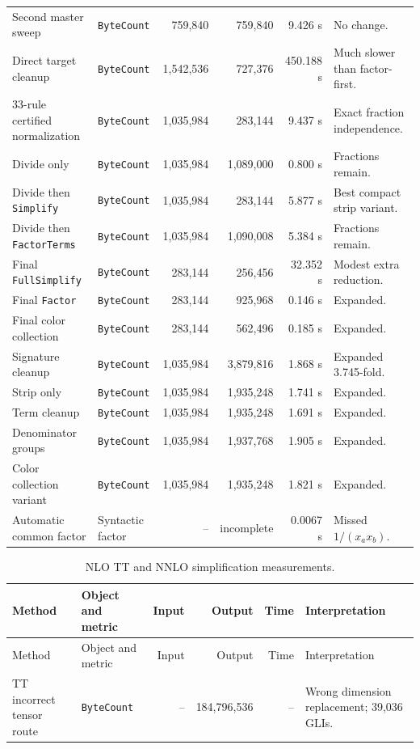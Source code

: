 \documentclass[11pt]{article}
\newcommand{\code}[1]{\texttt{#1}}
\begin{document}
\begin{landscape}
\begin{longtable}{@{}llrrrl@{}}
Second master sweep & \code{ByteCount} & 759,840 & 759,840 & 9.426 s & No change.\\
Direct target cleanup & \code{ByteCount} & 1,542,536 & 727,376 & 450.188 s & Much slower than factor-first.\\
33-rule certified normalization & \code{ByteCount} & 1,035,984 & 283,144 & 9.437 s & Exact fraction independence.\\
Divide only & \code{ByteCount} & 1,035,984 & 1,089,000 & 0.800 s & Fractions remain.\\
Divide then \code{Simplify} & \code{ByteCount} & 1,035,984 & 283,144 & 5.877 s & Best compact strip variant.\\
Divide then \code{FactorTerms} & \code{ByteCount} & 1,035,984 & 1,090,008 & 5.384 s & Fractions remain.\\
Final \code{FullSimplify} & \code{ByteCount} & 283,144 & 256,456 & 32.352 s & Modest extra reduction.\\
Final \code{Factor} & \code{ByteCount} & 283,144 & 925,968 & 0.146 s & Expanded.\\
Final color collection & \code{ByteCount} & 283,144 & 562,496 & 0.185 s & Expanded.\\
Signature cleanup & \code{ByteCount} & 1,035,984 & 3,879,816 & 1.868 s & Expanded 3.745-fold.\\
Strip only & \code{ByteCount} & 1,035,984 & 1,935,248 & 1.741 s & Expanded.\\
Term cleanup & \code{ByteCount} & 1,035,984 & 1,935,248 & 1.691 s & Expanded.\\
Denominator groups & \code{ByteCount} & 1,035,984 & 1,937,768 & 1.905 s & Expanded.\\
Color collection variant & \code{ByteCount} & 1,035,984 & 1,935,248 & 1.821 s & Expanded.\\
Automatic common factor & Syntactic factor & -- & incomplete & 0.0067 s & Missed $1/(x_a x_b)$.\\
\bottomrule
\end{longtable}
\scriptsize
\begin{longtable}{@{}llrrrl@{}}
\caption{NLO TT and NNLO simplification measurements.}\label{tab:all-ttnnlo}\\
\toprule
Method & Object and metric & Input & Output & Time & Interpretation \\
\midrule
\endfirsthead
\toprule
Method & Object and metric & Input & Output & Time & Interpretation \\
\midrule
\endhead
TT incorrect tensor route & \code{ByteCount} & -- & 184,796,536 & -- & Wrong dimension replacement; 39,036 GLIs.\\

\end{longtable}
\end{landscape}
\end{document}
